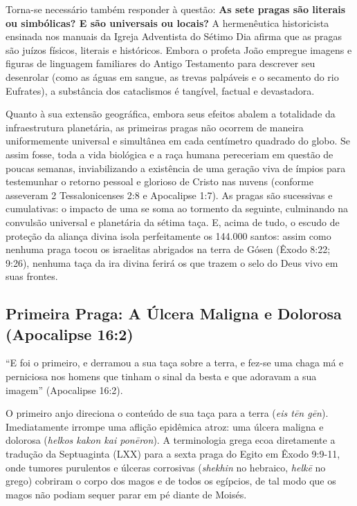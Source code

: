 Torna-se necessário também responder à questão: \textbf{As sete pragas são literais ou simbólicas? E são universais ou locais?}
A hermenêutica historicista ensinada nos manuais da Igreja Adventista do Sétimo Dia afirma que as pragas são juízos físicos, literais e históricos. Embora o profeta João empregue imagens e figuras de linguagem familiares do Antigo Testamento para descrever seu desenrolar (como as águas em sangue, as trevas palpáveis e o secamento do rio Eufrates), a substância dos cataclismos é tangível, factual e devastadora.

Quanto à sua extensão geográfica, embora seus efeitos abalem a totalidade da infraestrutura planetária, as primeiras pragas não ocorrem de maneira uniformemente universal e simultânea em cada centímetro quadrado do globo. Se assim fosse, toda a vida biológica e a raça humana pereceriam em questão de poucas semanas, inviabilizando a existência de uma geração viva de ímpios para testemunhar o retorno pessoal e glorioso de Cristo nas nuvens (conforme asseveram 2 Tessalonicenses 2:8 e Apocalipse 1:7). As pragas são sucessivas e cumulativas: o impacto de uma se soma ao tormento da seguinte, culminando na convulsão universal e planetária da sétima taça. E, acima de tudo, o escudo de proteção da aliança divina isola perfeitamente os 144.000 santos: assim como nenhuma praga tocou os israelitas abrigados na terra de Gósen (Êxodo 8:22; 9:26), nenhuma taça da ira divina ferirá os que trazem o selo do Deus vivo em suas frontes.



\subsection{Primeira Praga: A Úlcera Maligna e Dolorosa (Apocalipse 16:2)}


``E foi o primeiro, e derramou a sua taça sobre a terra, e fez-se uma chaga má e perniciosa nos homens que tinham o sinal da besta e que adoravam a sua imagem'' (Apocalipse 16:2).

O primeiro anjo direciona o conteúdo de sua taça para a terra (\textit{eis tēn gēn}). Imediatamente irrompe uma aflição epidêmica atroz: uma úlcera maligna e dolorosa (\textit{helkos kakon kai ponēron}). A terminologia grega ecoa diretamente a tradução da Septuaginta (LXX) para a sexta praga do Egito em Êxodo 9:9-11, onde tumores purulentos e úlceras corrosivas (\textit{shekhin} no hebraico, \textit{helkē} no grego) cobriram o corpo dos magos e de todos os egípcios, de tal modo que os magos não podiam sequer parar em pé diante de Moisés.

